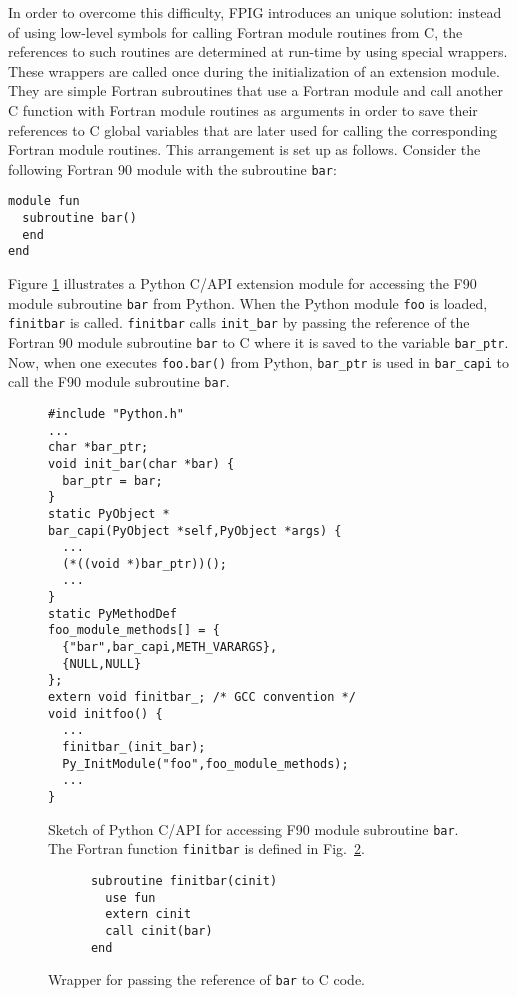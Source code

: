 \documentclass[twocolumn]{article}
\newcommand{\tthhide}[1]{#1}
\newcommand{\latexhide}[1]{}
\begin{document}
In order to overcome this difficulty, FPIG introduces an unique
solution: instead of using low-level symbols for calling Fortran
module routines from C, the references to such routines are determined
at run-time by using special wrappers. These wrappers are called once
during the initialization of an extension module. They are simple
Fortran subroutines that use a Fortran module and call another C
function with Fortran module routines as arguments in order to save
their references to C global variables that are later used for calling
the corresponding Fortran module routines. This arrangement is
set up as follows. Consider the following Fortran 90 module with the
subroutine \texttt{bar}:
\begin{verbatim}
module fun
  subroutine bar()
  end
end
\end{verbatim}
Figure \ref{fig:capi-sketch} illustrates a Python C/API extension
module for accessing the F90 module subroutine \texttt{bar} from Python.
When the Python module \texttt{foo} is loaded, \texttt{finitbar} is
called. \texttt{finitbar} calls \texttt{init\_bar} by passing the
reference of the Fortran 90 module subroutine \texttt{bar} to C where it is
saved to the variable \texttt{bar\_ptr}. Now, when one executes \texttt{foo.bar()}
from Python, \texttt{bar\_ptr} is used in \texttt{bar\_capi} to call
the F90 module subroutine \texttt{bar}.
\begin{figure}[htb]
  \latexhide{\label{fig:capi-sketch}}
\begin{verbatim}
#include "Python.h"
...
char *bar_ptr;
void init_bar(char *bar) {
  bar_ptr = bar;
}
static PyObject *
bar_capi(PyObject *self,PyObject *args) {
  ...
  (*((void *)bar_ptr))();
  ...
}
static PyMethodDef
foo_module_methods[] = {
  {"bar",bar_capi,METH_VARARGS},
  {NULL,NULL}
};
extern void finitbar_; /* GCC convention */
void initfoo() {
  ...
  finitbar_(init_bar);
  Py_InitModule("foo",foo_module_methods);
  ...
}
\end{verbatim}
  \caption{Sketch of Python C/API for accessing F90 module subroutine
    \texttt{bar}. The Fortran function \texttt{finitbar} is defined in
  Fig.~\ref{fig:wrapbar}.}
  \tthhide{\label{fig:capi-sketch}}
\end{figure}
\begin{figure}[ht]
  \latexhide{\label{fig:wrapbar}}
\begin{verbatim}
      subroutine finitbar(cinit)
        use fun
        extern cinit
        call cinit(bar)
      end
\end{verbatim}
  \caption{Wrapper for passing the reference of \texttt{bar} to C code.}
  \tthhide{\label{fig:wrapbar}}
\end{figure}
\end{document}
